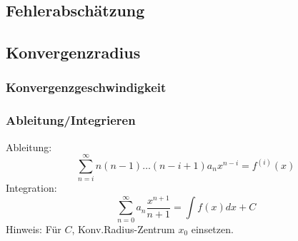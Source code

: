 \subsection{Fehlerabschätzung}

\subsection{Konvergenzradius}

\subsubsection{Konvergenzgeschwindigkeit}

\subsubsection{Ableitung/Integrieren}
Ableitung:\[\sum_{n=i}^{\infty}n(n-1)\dots(n-i+1)a_nx^{n-i}=f^{(i)}(x)\]
Integration: \[\sum_{n=0}^{\infty}a_n\frac{x^{n+1}}{n+1}=\int f(x)dx+C\]
Hinweis: Für $C$, Konv.Radius-Zentrum $x_0$ einsetzen.
